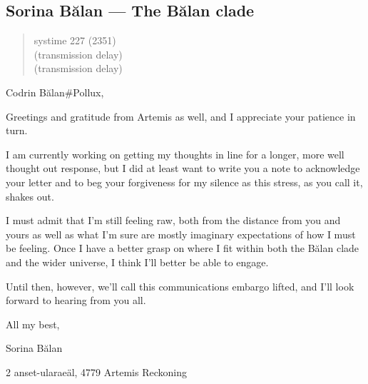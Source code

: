 \hypertarget{sorina-bux103lan-the-bux103lan-clade}{%
\subsection{Sorina Bălan — The Bălan clade}\label{sorina-bux103lan-the-bux103lan-clade}}

\begin{quote}
systime 227 (2351)\\
(transmission delay)\\
(transmission delay)
\end{quote}

Codrin Bălan\#Pollux,

Greetings and gratitude from Artemis as well, and I appreciate your patience in turn.

I am currently working on getting my thoughts in line for a longer, more well thought out response, but I did at least want to write you a note to acknowledge your letter and to beg your forgiveness for my silence as this stress, as you call it, shakes out.

I must admit that I'm still feeling raw, both from the distance from you and yours as well as what I'm sure are mostly imaginary expectations of how I must be feeling. Once I have a better grasp on where I fit within both the Bălan clade and the wider universe, I think I'll better be able to engage.

Until then, however, we'll call this communications embargo lifted, and I'll look forward to hearing from you all.

All my best,

Sorina Bălan

2 anset-ularaeäl, 4779 Artemis Reckoning
